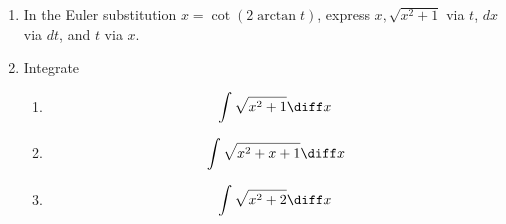 \begin{enumerate}
\item In the Euler substitution $x=\cot (2\arctan t)$, express  $x,\sqrt{x^2+1} $ via $t$, $dx$ via $dt$, and $t$ via $x$.
\item Integrate
\begin{enumerate}
\item 
\[
\int \sqrt{x^2+1}\diff x
\]
\item 
\[
\int \sqrt{x^2+x+1}\diff x
\]
\item 
\[
\int \sqrt{x^2+2}\diff x
\]
\end{enumerate}


\end{enumerate}
